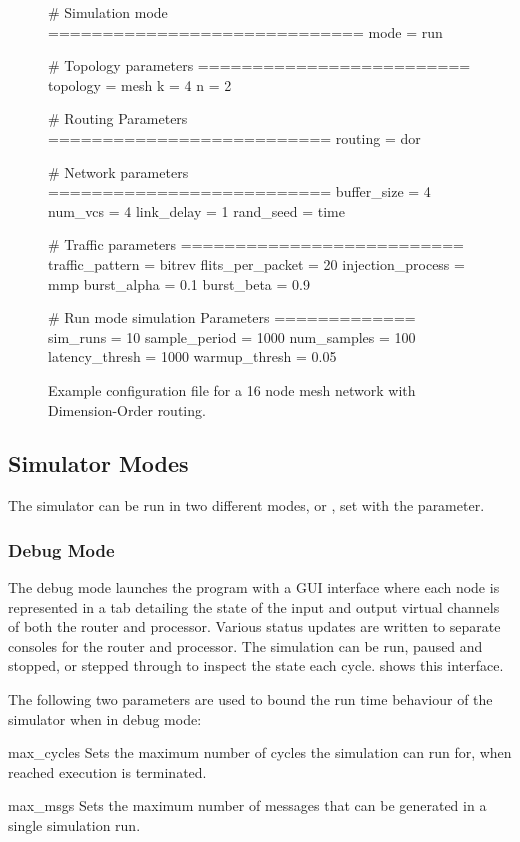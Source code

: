 \documentclass[10pt,a4paper]{article}
\begin{document}
\begin{figure}[t]
\begin{egcode}
# Simulation mode ============================= 
mode              = run

# Topology parameters =========================
topology          = mesh
k                 = 4
n                 = 2

# Routing Parameters ==========================
routing           = dor

# Network parameters ==========================
buffer_size       = 4
num_vcs           = 4
link_delay        = 1
rand_seed         = time

# Traffic parameters ==========================
traffic_pattern   = bitrev
flits_per_packet  = 20
injection_process = mmp
burst_alpha       = 0.1
burst_beta        = 0.9

# Run mode simulation Parameters =============
sim_runs          = 10
sample_period     = 1000
num_samples       = 100
latency_thresh    = 1000
warmup_thresh     = 0.05
\end{egcode}
\caption{Example configuration file for a 16 node mesh network with
Dimension-Order routing.}
\label{fig:egcfg}
\end{figure}

\subsection{Simulator Modes}

The simulator can be run in two different modes,  or , set
with the  parameter. 

\subsubsection{Debug Mode}

The debug mode launches the program with a GUI interface where each node is
represented in a tab detailing the state of the input and output virtual
channels of both the router and processor. Various status updates are written to
separate consoles for the router and processor.  The simulation can be run,
paused and stopped, or stepped through to inspect the state each cycle.
 shows this interface. 

The following two parameters are used to bound the run time behaviour of the
simulator when in debug mode: 

\begin{paramlist}

\item[max\_cycles] Sets the maximum number of cycles the simulation can run for,
when reached execution is terminated.

\item[max\_msgs] Sets the maximum number of messages that can be generated in a
single simulation run.

\end{paramlist}
\end{document}
